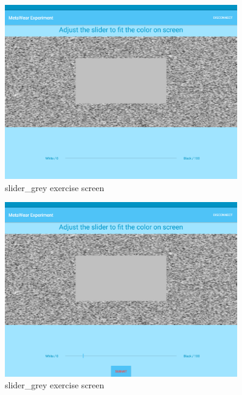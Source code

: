 \begin{figure}[h!]
\centering
\includegraphics[width=0.9\textwidth]{figures/tablet_screen7.png}
\caption{slider\_grey exercise screen}
\label{appendix_app_screen_7}
\end{figure}

\begin{figure}[h!]
\centering
\includegraphics[width=0.9\textwidth]{figures/tablet_screen8.png}
\caption{slider\_grey exercise screen}
\label{appendix_app_screen_8}
\end{figure}

